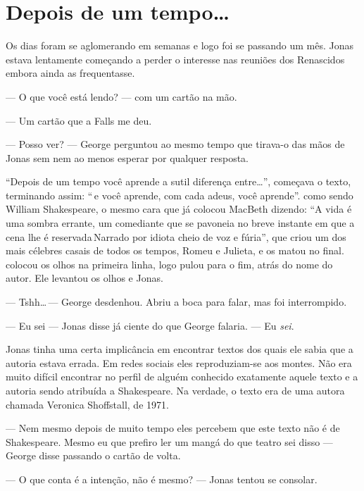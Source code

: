 \chapter{Depois de um tempo\ldots}

Os dias foram se aglomerando em semanas e logo foi se passando um mês. Jonas estava lentamente começando a perder o interesse nas reuniões dos Renascidos\mudanca{,} embora ainda as frequentasse.

--- O que você está lendo? ---  com um cartão na mão.

--- Um cartão que a Falls me deu.

--- Posso ver? --- George perguntou\mudanca{,} ao mesmo tempo que tirava-o das mãos de Jonas\mudanca{,} sem nem ao menos esperar por qualquer resposta.

``Depois de um tempo você aprende a sutil diferença entre\ldots'', começava o texto, terminando assim: ``\mudanca{\ldots}\,e você aprende, com cada adeus, você aprende''.  como sendo William Shakespeare, o mesmo cara que já colocou MacBeth dizendo: ``A vida é uma sombra errante, um comediante que se pavoneia no breve instante em que a cena lhe é reservada\mudanca{\ldots}\,Narrado por idiota cheio de voz e fúria'', que criou um dos mais célebres casais de todos os tempos, Romeu e Julieta, e os matou no final.  colocou os olhos na primeira linha, logo pulou para o fim, atrás do nome do autor. Ele levantou os olhos e  Jonas.

--- Tshh\ldots\,--- George desdenhou. Abriu a boca para falar, mas foi interrompido.

--- Eu sei --- Jonas disse\mudanca{,} já ciente do que George falaria. --- Eu \emph{sei}.

Jonas tinha uma certa implicância em encontrar textos dos quais ele sabia que a autoria estava errada. Em redes sociais eles reproduziam-se aos montes. Não era muito difícil encontrar no perfil de alguém conhecido exatamente aquele texto e a autoria sendo atribuída a Shakespeare. Na verdade, o texto era de uma autora chamada Veronica Shoffstall, de 1971.

--- Nem mesmo depois de muito tempo eles percebem que este texto não é de Shakespeare. Mesmo eu que prefiro ler um mangá do que teatro sei disso --- George disse\mudanca{,} passando o cartão de volta.

--- O que conta é a intenção, não é mesmo? --- Jonas tentou se consolar.

